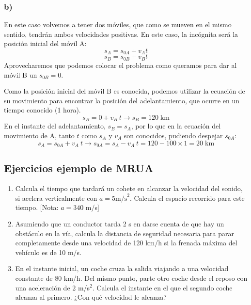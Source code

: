 \documentclass[ %
    oneside,    %
    10pt        %
]{apuntes} %
\begin{document}
\begin{examplebox}
	\subsubsection*{b)}
	En este caso volvemos a tener dos móviles, que como se mueven en el mismo sentido, tendrán ambos velocidades positivas. En este caso, la incógnita será la posición inicial del móvil A:
	\[ s_A = s_{0A} + v_A t\]
	\[ s_B = s_{0B} + v_B t\]
	Aprovecharemos que podemos colocar el problema como queramos para dar al móvil B un $s_{0B} = 0$.
	\begin{center}
	\end{center}

	Como la posición inicial del móvil B es conocida, podemos utilizar la ecuación de su movimiento para encontrar la posición del adelantamiento, que ocurre en un tiempo conocido (1 hora).
	\[s_B = 0 + v_B\ t \to s_B = 120 \; \text{km} \]
	En el instante del adelantamiento, $s_B = s_A$, por lo que en la ecuación del movimiento de A, tanto $t$ como $s_A$ y $v_A$ son conocidos, pudiendo despejar $s_{0A}$:
	\[s_A = s_{0A} + v_A\ t \to s_{0A} = s_A - v_A\ t = 120 - 100\times 1 = 20 \; \text{km}\]

	\subsection*{Ejercicios ejemplo de MRUA}
	\begin{enumerate}[label = \alph*) ]
		\item Calcula el tiempo que tardará un cohete en alcanzar la velocidad del sonido, si acelera verticalmente con $a = 5 \text{m/s}^2$. Calcula el espacio recorrido para este tiempo. [Nota: $a = 340$ m/s]
		\item Asumiendo que un conductor tarda 2 s en darse cuenta de que hay un obstáculo en la vía, calcula la distancia de seguridad necesaria para parar completamente desde una velocidad de 120 km/h si la frenada máxima del vehículo es de 10 m/s.
		\item En el instante inicial, un coche cruza la salida viajando a una velocidad constante de 80 km/h. Del mismo punto, parte otro coche desde el reposo con una aceleración de 2 m/s$^2$. Calcula el instante en el que el segundo coche alcanza al primero. ¿Con qué velocidad le alcanza?
	\end{enumerate}


\end{examplebox}
\end{document}
